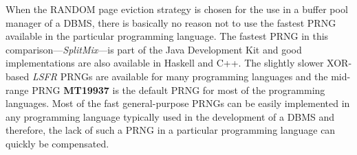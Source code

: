     When the RANDOM page eviction strategy is chosen for the use in a buffer pool manager of a DBMS, there is basically no reason not to use the fastest PRNG available in the particular programming language. The fastest PRNG in this comparison---\emph{SplitMix}---is part of the Java Development Kit and good implementations are also available in Haskell and C++. The slightly slower XOR-based \emph{LSFR} PRNGs are available for many programming languages and the mid-range PRNG \textbf{MT19937} is the default PRNG for most of the programming languages. Most of the fast general-purpose PRNGs can be easily implemented in any programming language typically used in the development of a DBMS and therefore, the lack of such a PRNG in a particular programming language can quickly be compensated.
